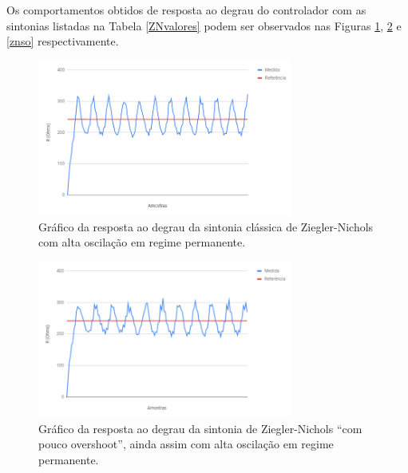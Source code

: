 Os comportamentos obtidos de resposta ao degrau do controlador com as sintonias listadas na Tabela \ref{ZNvalores} podem ser observados nas Figuras \ref{znclass}, \ref{znpo} e \ref{znso} respectivamente.
\begin{figure}[ht]
    \begin{center}
    \includegraphics[width=0.75\textwidth]{figuras/znclass.PNG}
    \end{center}
    \caption[Gráfico da sintonia clássica de Ziegler-Nichols.]{Gráfico da resposta ao degrau da sintonia clássica de Ziegler-Nichols com alta oscilação em regime permanente.}
    \label{znclass}
\end{figure}
\begin{figure}[ht]
    \begin{center}
    \includegraphics[width=0.75\textwidth]{figuras/znpo.PNG}
    \end{center}
    \caption[Gráfico da sintonia de Ziegler-Nichols ``com pouco overshoot''.]{Gráfico da resposta ao degrau da sintonia de Ziegler-Nichols ``com pouco overshoot'', ainda assim com alta oscilação em regime permanente.}
    \label{znpo}
\end{figure}
